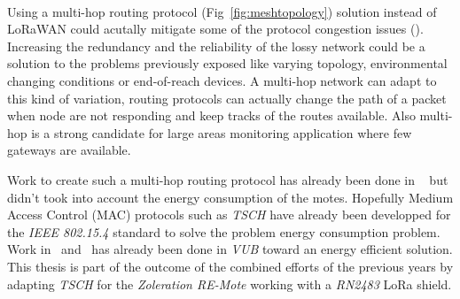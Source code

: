 \paragraph{}


Using a multi-hop routing protocol (Fig~\ref{fig:meshtopology}) solution
instead of LoRaWAN could acutally mitigate some of the protocol congestion
issues (\cite{8115756}).
Increasing the redundancy and the reliability of the lossy network could be a
solution to the problems previously exposed like varying topology,
environmental changing conditions or end-of-reach devices.
A multi-hop network can adapt to this kind of variation, routing protocols can
actually change the path of a packet when node are not responding and keep
tracks of the routes available.
Also multi-hop is a strong candidate for large areas monitoring application
where few gateways are available.

Work to create such a multi-hop routing protocol has already been done in
~\cite{8115756} but didn't took into account the energy consumption of the
motes. Hopefully Medium Access Control (MAC) protocols such as \emph{TSCH} have
already been developped for the \emph{IEEE 802.15.4} standard to solve the
problem energy consumption problem.
Work in~\cite{8847137} and~\cite{njomgang_2018} has already been done in
\emph{VUB} toward an energy efficient solution.
This thesis is part of the outcome of the combined efforts of the previous
years by adapting \emph{TSCH} for the \emph{Zoleration RE-Mote} working with a
\emph{RN2483} LoRa shield.



